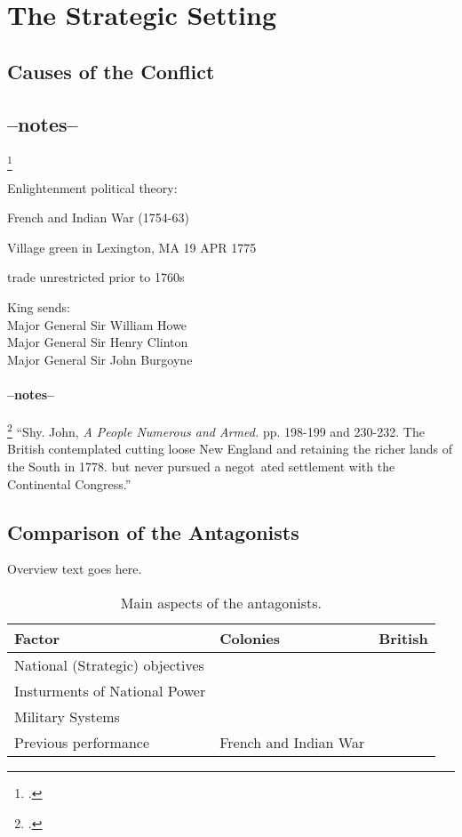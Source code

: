 \section{The Strategic Setting}

\subsection{Causes of the Conflict}

\subsection{--notes--}\footcite[2]{moncure_cowpens_1996}

Enlightenment political theory:

French and Indian War (1754-63)

Village green in Lexington, MA 19 APR 1775

trade unrestricted prior to 1760s

King sends:\\
Major General Sir William Howe\\
Major General Sir Henry Clinton\\
Major General Sir John Burgoyne

\paragraph{--notes--}\footcite[]{}
``Shy. John, \emph{A People Numerous and Armed.} pp. 198-199 and 230-232. The British contemplated cutting loose New England and retaining the richer lands of the South in 1778. but never pursued a negot~ated settlement with the Continental Congress.''




\subsection{Comparison of the Antagonists}

Overview text goes here.

\begin{table}[h!]
  \begin{center}
    \small
\begin{tabular}{p{2.5in}p{2in}p{2in}}\toprule
Factor				&	Colonies	& British	\\\midrule
National (Strategic) objectives	&			&		\\
Insturments of National Power	&			&		\\
Military Systems		&			&		\\
Previous performance		& French and Indian War	&		\\\bottomrule
\end{tabular}
\end{center}
\caption{Main aspects of the antagonists.}
\end{table}

